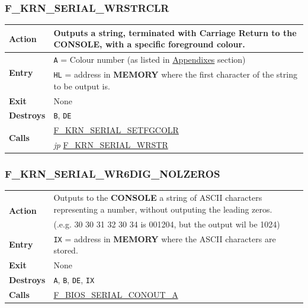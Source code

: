 \documentclass[a4paper,11pt]{article}
\begin{document}
        \subsubsection{F\_KRN\_SERIAL\_WRSTRCLR}
        \label{func:fkrnserialwrstrclr}
        \begin{tabular}{l p{9cm}}
            \hline\textbf{Action}
            & Outputs a string, terminated with Carriage Return to the 
            \textbf{CONSOLE}, with a specific foreground colour. \\
            \hline\multirow[t]{2}{4em}{\textbf{Entry}}
            & \texttt{A} = Colour number (as listed in 
            \hyperref[sec:appendixes]{Appendixes} section) \\
            & \texttt{HL} = address in \textbf{MEMORY} where the first character
            of the string to be output is.\\
            \hline\textbf{Exit} & None \\
            \hline\textbf{Destroys} & \texttt{B}, \texttt{DE} \\
            \hline\multirow[t]{2}{4em}{\textbf{Calls}} 
            & \hyperref[func:fkrnserialsetfgcolr]{F\_KRN\_SERIAL\_SETFGCOLR}\\
            & \textit{jp} \hyperref[func:fkrnserialwrstr]{F\_KRN\_SERIAL\_WRSTR}\\
            \hline
        \end{tabular}

        \subsubsection{F\_KRN\_SERIAL\_WR6DIG\_NOLZEROS}
        \label{func:fkrnserialwr6dignolzeros}
        \begin{tabular}{l p{9cm}}
            \hline\multirow[t]{2}{4em}{\textbf{Action}}
            & Outputs to the \textbf{CONSOLE} a string of ASCII characters 
            representing a number, without outputing the leading zeros.\\
            & (.e.g. 30 30 31 32 30 34 is 001204, but the output wil be 1024)\\
            \hline\textbf{Entry} 
            & \texttt{IX} = address in \textbf{MEMORY} where the ASCII 
            characters are stored.\\
            \hline\textbf{Exit} & None \\
            \hline\textbf{Destroys} & \texttt{A}, \texttt{B}, \texttt{DE}, \texttt{IX} \\
            \hline\textbf{Calls}
            & \hyperref[func:fbiosserialconouta]{F\_BIOS\_SERIAL\_CONOUT\_A}\\
            \hline
        \end{tabular}
\end{document}
